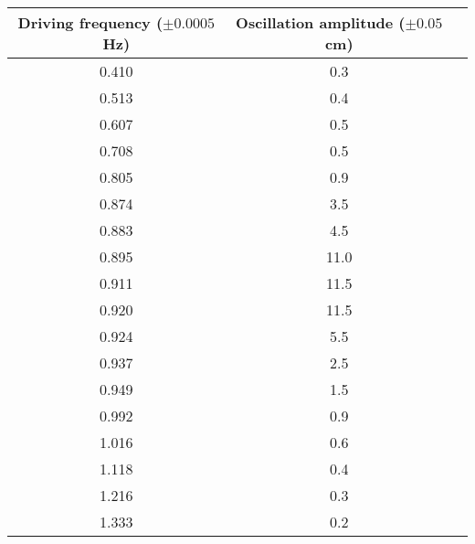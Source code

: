 \begin{tabular}{ccc}
\toprule
 Driving frequency ($\pm 0.0005$ Hz) &  Oscillation amplitude ($\pm 0.05$ cm) \\
\midrule
                              0.410 &                                   0.3 \\
                              0.513 &                                   0.4 \\
                              0.607 &                                   0.5 \\
                              0.708 &                                   0.5 \\
                              0.805 &                                   0.9 \\
                              0.874 &                                   3.5 \\
                              0.883 &                                   4.5 \\
                              0.895 &                                  11.0 \\
                              0.911 &                                  11.5 \\
                              0.920 &                                  11.5 \\
                              0.924 &                                   5.5 \\
                              0.937 &                                   2.5 \\
                              0.949 &                                   1.5 \\
                              0.992 &                                   0.9 \\
                              1.016 &                                   0.6 \\
                              1.118 &                                   0.4 \\
                              1.216 &                                   0.3 \\
                              1.333 &                                   0.2 \\
\bottomrule
\end{tabular}

